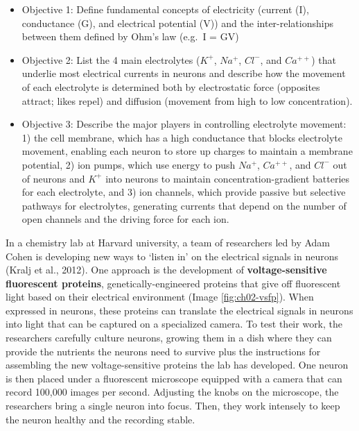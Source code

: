 \documentclass[
]{book}
\begin{document}
\begin{itemize}
\item
  Objective 1: Define fundamental concepts of electricity (current (I), conductance (G), and electrical potential (V)) and the inter-relationships between them defined by Ohm's law (e.g.~I = GV)
\item
  Objective 2: List the 4 main electrolytes (\(K^+\), \(Na^+\), \(Cl^{-}\), and \(Ca^{++}\)) that underlie most electrical currents in neurons and describe how the movement of each electrolyte is determined both by electrostatic force (opposites attract; likes repel) and diffusion (movement from high to low concentration).
\item
  Objective 3: Describe the major players in controlling electrolyte movement: 1) the cell membrane, which has a high conductance that blocks electrolyte movement, enabling each neuron to store up charges to maintain a membrane potential, 2) ion pumps, which use energy to push \(Na^+\), \(Ca^{++}\), and \(Cl^{-}\) out of neurons and \(K^+\) into neurons to maintain concentration-gradient batteries for each electrolyte, and 3) ion channels, which provide passive but selective pathways for electrolytes, generating currents that depend on the number of open channels and the driving force for each ion.
\end{itemize}

In a chemistry lab at Harvard university, a team of researchers led by Adam Cohen is developing new ways to `listen in' on the electrical signals in neurons (Kralj et al., 2012). One approach is the development of \textbf{voltage-sensitive fluorescent proteins}, genetically-engineered proteins that give off fluorescent light based on their electrical environment (Image \ref{fig:ch02-vsfp}). When expressed in neurons, these proteins can translate the electrical signals in neurons into light that can be captured on a specialized camera. To test their work, the researchers carefully culture neurons, growing them in a dish where they can provide the nutrients the neurons need to survive plus the instructions for assembling the new voltage-sensitive proteins the lab has developed. One neuron is then placed under a fluorescent microscope equipped with a camera that can record 100,000 images per second. Adjusting the knobs on the microscope, the researchers bring a single neuron into focus. Then, they work intensely to keep the neuron healthy and the recording stable.
\end{document}
